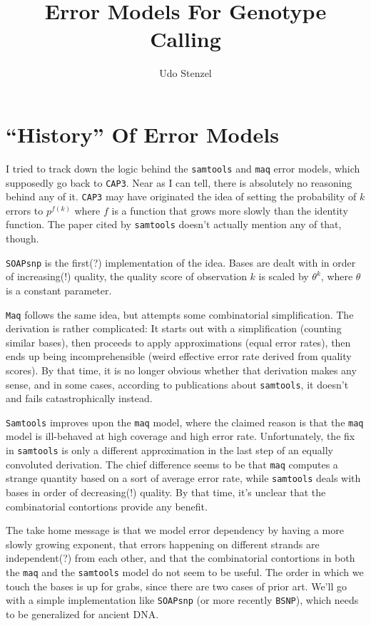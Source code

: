 \documentclass{article}
\title{Error Models For Genotype Calling}
\author{Udo Stenzel}
\begin{document}
\maketitle

\section{``History'' Of Error Models}

I tried to track down the logic behind the \texttt{samtools} and
\texttt{maq} error models, which supposedly go back to \texttt{CAP3}.
Near as I can tell, there is absolutely no reasoning behind any of it.
\texttt{CAP3} may have originated the idea of setting the probability of
$k$ errors to $p^{f(k)}$ where $f$ is a function that grows more slowly
than the identity function.  The paper cited by \texttt{samtools}
doesn't actually mention any of that, though.

\texttt{SOAPsnp}\cite{soapsnp} is the first(?) implementation of the idea.  Bases are
dealt with in order of increasing(!) quality, the quality score of
observation $k$ is scaled by $\theta^k$, where $\theta$ is a constant
parameter.

\texttt{Maq}\cite{maq} follows the same idea, but attempts some combinatorial
simplification.  The derivation is rather complicated:  It starts out
with a simplification (counting similar bases), then proceeds to apply
approximations (equal error rates), then ends up being incomprehensible
(weird effective error rate derived from quality scores).  By that time,
it is no longer obvious whether that derivation makes any sense, and in
some cases, according to publications about
\texttt{samtools}\cite{samtools}, it
doesn't and fails catastrophically instead.

\texttt{Samtools}\cite{samtools} improves upon the \texttt{maq} model, where the
claimed reason is that the \texttt{maq} model is ill-behaved at high
coverage and high error rate.  Unfortunately, the fix in
\texttt{samtools} is only a different approximation in the last step of
an equally convoluted derivation.  The chief difference seems to be that
\texttt{maq} computes a strange quantity based on a sort of average
error rate, while \texttt{samtools} deals with bases in order of
decreasing(!) quality.  By that time, it's unclear that the
combinatorial contortions provide any benefit.

The take home message is that we model error dependency by having a more
slowly growing exponent, that errors happening on different strands are
independent(?) from each other, and that the combinatorial
contortions in both the \texttt{maq} and the \texttt{samtools} model do
not seem to be useful.  The order in which we touch the bases is up for
grabs, since there are two cases of prior art.  We'll go with a simple
implementation like \texttt{SOAPsnp} (or more recently
\texttt{BSNP}\cite{bsnp}), which needs to be generalized for ancient
DNA.
\end{document}
